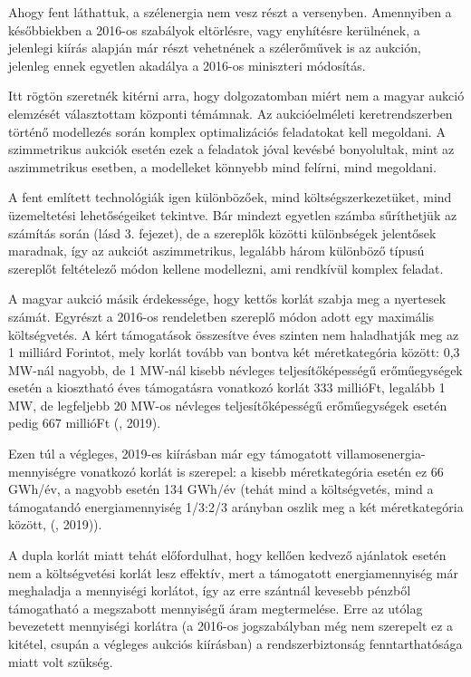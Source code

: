 \documentclass[twoside, magyar, showtrims]{corvinusphd}
\theoremstyle{plain}
\theoremstyle{remark}
\theoremstyle{definition}
\begin{document}
Ahogy fent láthattuk, a szélenergia
nem vesz részt a versenyben. Amennyiben a későbbiekben
a 2016-os szabályok eltörlésre, vagy enyhítésre
kerülnének, a jelenlegi kiírás alapján már
részt vehetnének a szélerőművek is az aukción,
jelenleg ennek egyetlen akadálya a 2016-os miniszteri módosítás.

Itt rögtön szeretnék kitérni arra, hogy dolgozatomban miért nem a magyar aukció elemzését
választottam központi témámnak. Az aukcióelméleti keretrendszerben történő
modellezés során komplex optimalizációs feladatokat kell megoldani.
A szimmetrikus aukciók esetén ezek a feladatok jóval kevésbé bonyolultak,
mint az aszimmetrikus esetben, a modelleket könnyebb mind felírni, mind megoldani.

A fent említett technológiák igen különbözőek, mind költségszerkezetüket,
mind üzemeltetési lehetőségeiket tekintve. Bár mindezt egyetlen számba
sűríthetjük az  számítás során (lásd 3. fejezet), 
de a szereplők közötti különbségek jelentősek maradnak, így az aukciót
aszimmetrikus, legalább három különböző típusú szereplőt feltételező
módon kellene modellezni, ami rendkívül komplex feladat.

A magyar aukció másik érdekessége,
hogy kettős korlát szabja meg a nyertesek számát.
Egyrészt a 2016-os rendeletben szereplő
módon adott egy maximális költségvetés.
A kért támogatások összesítve éves szinten
nem haladhatják meg az 1 milliárd Forintot, 
mely korlát tovább van bontva két méretkategória között:
0,3 MW-nál nagyobb, de 1 MW-nál
kisebb névleges teljesítőképességű erőműegységek
esetén a kiosztható éves támogatásra
vonatkozó korlát 333 millióFt, legalább 1 MW, de legfeljebb 20 MW-os
névleges teljesítőképességű erőműegységek 
esetén pedig 667 millióFt (, 2019).

Ezen túl a végleges, 2019-es kiírásban már egy
támogatott villamosenergia-mennyiségre vonatkozó korlát
is szerepel: a kisebb méretkategória esetén ez 66 GWh/év,
a nagyobb esetén 134 GWh/év (tehát mind a költségvetés,
mind a támogatandó energiamennyiség 1/3:2/3 arányban oszlik
meg a két méretkategória között, (, 2019)).

A dupla korlát miatt tehát előfordulhat, hogy kellően kedvező ajánlatok
esetén nem a költségvetési korlát lesz effektív, mert a támogatott energiamennyiség
már meghaladja a mennyiségi korlátot, így az erre szántnál kevesebb
pénzből támogatható a megszabott mennyiségű áram megtermelése.
Erre az utólag bevezetett mennyiségi korlátra (a 2016-os jogszabályban még
nem szerepelt ez a kitétel, csupán a végleges aukciós kiírásban)
a rendszerbiztonság fenntarthatósága miatt volt szükség.
\end{document}
